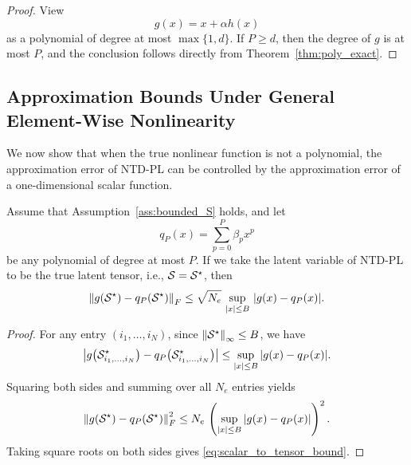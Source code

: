 \begin{proof}
View
\begin{equation}
g(x)=x+\alpha h(x)
\end{equation}
as a polynomial of degree at most $\max\{1,d\}$. If $P\ge d$, then the degree of $g$ is at most $P$, and the conclusion follows directly from Theorem~\ref{thm:poly_exact}.
\end{proof}

\subsection{Approximation Bounds Under General Element-Wise Nonlinearity}

We now show that when the true nonlinear function is not a polynomial, the approximation error of NTD-PL can be controlled by the approximation error of a one-dimensional scalar function.

\begin{theorem}
\label{thm:scalar_to_tensor}
Assume that Assumption~\ref{ass:bounded_S} holds, and let
\begin{equation}
q_P(x)=\sum_{p=0}^{P}\beta_p x^p
\end{equation}
be any polynomial of degree at most $P$. If we take the latent variable of NTD-PL to be the true latent tensor, i.e., $\mathcal{S}=\mathcal{S}^\star$, then
\begin{equation}
\left\lVert 
g(\mathcal{S}^\star)-q_P(\mathcal{S}^\star)
 \right\rVert_F
\le
\sqrt{N_e}\,
\sup_{|x|\le B}\,
|g(x)-q_P(x)|.
\label{eq:scalar_to_tensor_bound}
\end{equation}
\end{theorem}

\begin{proof}
For any entry $(i_1,\dots,i_N)$, since $\left\lVert \mathcal{S}^\star \right\rVert_\infty\le B$, we have
\begin{equation}
\left|
g\!\left(\mathcal{S}^\star_{i_1,\dots,i_N}\right)
-
q_P\!\left(\mathcal{S}^\star_{i_1,\dots,i_N}\right)
\right|
\le
\sup_{|x|\le B}|g(x)-q_P(x)|.
\end{equation}
Squaring both sides and summing over all $N_e$ entries yields
\begin{equation}
\left\lVert 
g(\mathcal{S}^\star)-q_P(\mathcal{S}^\star)
 \right\rVert_F^2
\le
N_e\,
\left(
\sup_{|x|\le B}|g(x)-q_P(x)|
\right)^2.
\end{equation}
Taking square roots on both sides gives \eqref{eq:scalar_to_tensor_bound}.
\end{proof}


